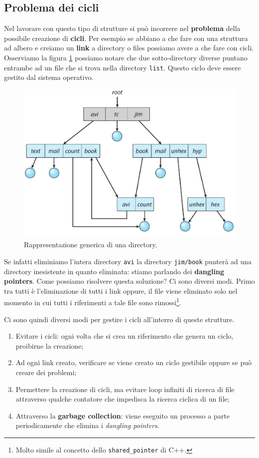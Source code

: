 \subsection{Problema dei cicli}
Nel lavorare con questo tipo di strutture si può incorrere nel \textbf{problema} della possibile creazione di \textbf{cicli}. Per esempio se abbiano a che fare con una struttura ad albero e creiamo un \textbf{link} a directory o files possiamo avere a che fare con cicli. Osserviamo la figura \ref{fig:acyclic-graph dir} possiamo notare che due sotto-directory diverse puntano entrambe ad un file che si trova nella directory \texttt{list}. Questo ciclo deve essere gestito dal sistema operativo.
\begin{figure}[h]
    \centering
    \includegraphics[width = .5\textwidth]{../res/imgs/file system interface/general graph dir.png}
    \caption{Rappresentazione generica di una directory.}
    \label{fig:acyclic-graph dir}
\end{figure}
Se infatti eliminiamo l'intera directory \texttt{avi} la directory \texttt{jim/book} punterà ad una directory inesistente in quanto eliminata: stiamo parlando dei \textbf{dangling pointers}. Come possiamo risolvere questa soluzione? Ci sono diversi modi. Primo tra tutti è l'eliminazione di tutti i link oppure, il file viene eliminato solo nel momento in cui tutti i riferimenti a tale file sono rimossi\footnote{Molto simile al concetto dello \texttt{shared\_pointer} di C++.}.

Ci sono quindi diversi modi per gestire i cicli all'interro di queste strutture.
\vspace{-5px}
\begin{enumerate}
\setlength{\itemsep}{-.15 em}
    \item Evitare i cicli: ogni volta che si crea un riferimento che genera un ciclo, proibirne la creazione;
    \item Ad ogni link creato, verificare se viene creato un ciclo gestibile oppure se può creare dei problemi;
    \item Permettere la creazione di cicli, ma evitare loop infiniti di ricerca di file attraverso qualche contatore che impedisca la ricerca ciclica di un file;
    \item Attraverso la \textbf{garbage collection}: viene eseguito un processo a parte periodicamente che elimina i \textit{dangling pointers}.
\end{enumerate}

